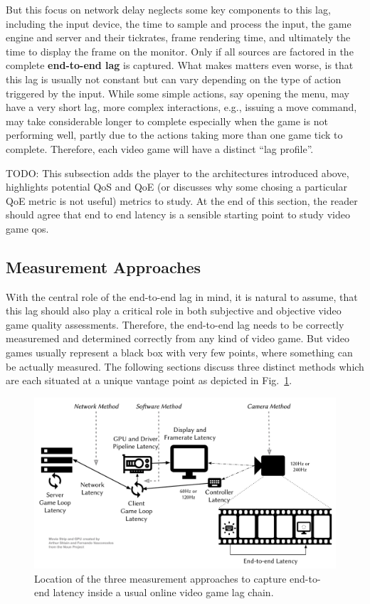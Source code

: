 But this focus on network delay neglects some key components to this lag, including the input device, the time to sample and process the input, the game engine and server and their tickrates, frame rendering time, and ultimately the time to display the frame on the monitor. Only if all sources are factored in the complete \textbf{end-to-end lag} is captured. What makes matters even worse, is that this lag is usually not constant but can vary depending on the type of action triggered by the input. While some simple actions, say opening the menu, may have a very short lag, more complex interactions, e.g., issuing a move command, may take considerable longer to complete especially when the game is not performing well, partly due to the actions taking more than one game tick to complete. Therefore, each video game will have a distinct ``lag profile''.  


TODO:
This subsection adds the player to the architectures introduced above, highlights potential QoS and QoE (or discusses why some chosing a particular QoE metric is not useful) metrics to study. At the end of this section, the reader should agree that end to end latency is a sensible starting point to study video game qos.


\subsection{Measurement Approaches}
\label{sec:measurementapproaches}

With the central role of the end-to-end lag in mind, it is natural to assume, that this lag should also play a critical role in both subjective and objective video game quality assessments. Therefore, the end-to-end lag needs to be correctly measuremed and determined correctly from any kind of video game. But video games usually represent a black box with very few points, where something can be actually measured. The following sections discuss three distinct methods which are each situated at a unique vantage point as depicted in Fig.~\ref{fig:measurement-methods}.

\begin{figure}[!t]
    \centering
    \includegraphics[width=1.0\columnwidth]{../models/e2e-lag.pdf}
    \caption{Location of the three measurement approaches to capture end-to-end latency inside a usual online video game lag chain.}
\label{fig:measurement-methods}
\end{figure}

